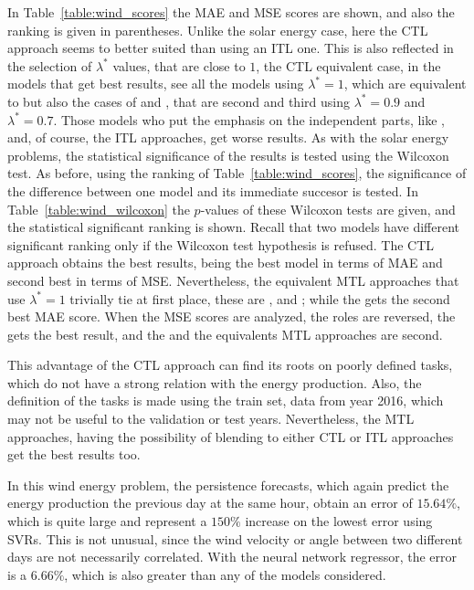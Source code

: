 In Table~\ref{table:wind_scores} the MAE and MSE scores are shown, and also the ranking is given in parentheses. 
Unlike the solar energy case, here the CTL approach seems to better suited than using an ITL one. This is also reflected in the selection of $\lambda^*$ values, that are close to $1$, the CTL equivalent case, in the models that get best results, see all the models using $\lambda^*=1$, which are equivalent to  but also the cases of  and , that are second and third using $\lambda^*=0.9$ and $\lambda^*=0.7$.
Those models who put the emphasis on the independent parts, like , and, of course, the ITL approaches, get worse results.
%
%
As with the solar energy problems, the statistical significance of the results is tested using the Wilcoxon test. As before, using the ranking of Table~\ref{table:wind_scores}, the significance of the difference between one model and its immediate succesor is tested. 
%
In Table~\ref{table:wind_wilcoxon} the $p$-values of these Wilcoxon tests are given, and the statistical significant ranking is shown. Recall that two models have different significant ranking only if the Wilcoxon test hypothesis is refused.
%
The CTL approach obtains the best results, being the best model in terms of MAE and second best in terms of MSE. Nevertheless, the equivalent MTL approaches that use $\lambda^*=1$ trivially tie at first place, these are ,  and ; while the  gets the second best MAE score.
When the MSE scores are analyzed, the roles are reversed, the  gets the best result, and the  and the equivalents MTL approaches are second.

%
This advantage of the CTL approach can find its roots on poorly defined tasks, which do not have a strong relation with the energy production. Also, the definition of the tasks is made using the train set, data from year 2016, which may not be useful to the validation or test years.
Nevertheless, the MTL approaches, having the possibility of blending to either CTL or ITL approaches get the best results too.

%
In this wind energy problem, the persistence forecasts, which again predict the energy production the previous day at the same hour, obtain an error of $15.64\%$, which is quite large and represent a $150\%$ increase on the lowest error using SVRs. This is not unusual, since the wind velocity or angle between two different days are not necessarily correlated.
%
With the neural network regressor, the error is a $6.66\%$, which is also greater than any of the models considered.


